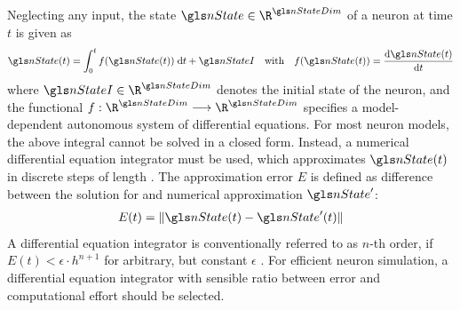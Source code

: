Neglecting any input, the state $\nState \in \R^{\nStateDim}$ of a neuron at time $t$ is given as
\begin{align}
	\nState(t) = \int_{0}^t f(\nState(t)) \;\mathrm{d}t + \nStateI \quad \text{with} \quad f(\nState(t)) = \frac{\mathrm{d} \nState(t)}{\mathrm{d}t}
\end{align}
where $\nStateI \in \R^{\nStateDim}$ denotes the initial state of the neuron, and the functional $f : \R^{\nStateDim} \longrightarrow \R^{\nStateDim}$ specifies a model-dependent autonomous system of differential equations. For most neuron models, the above integral cannot be solved in a closed form. Instead, a numerical differential equation integrator must be used, which approximates $\nState(t)$ in discrete steps of length \stepSize. The approximation error $E$ is defined as difference between the solution for \nState and numerical approximation $\nState'$:
\begin{align}
	E(t) = \| \nState(t) - \nState'(t) \|
\end{align}
A differential equation integrator is conventionally referred to as \mbox{$n$-th} order, if $E(t) < \epsilon \cdot h^{n + 1}$ for arbitrary, but constant $\epsilon$ \cite{press2007numerical}. For efficient neuron simulation, a differential equation integrator with sensible ratio between error and computational effort should be selected.

